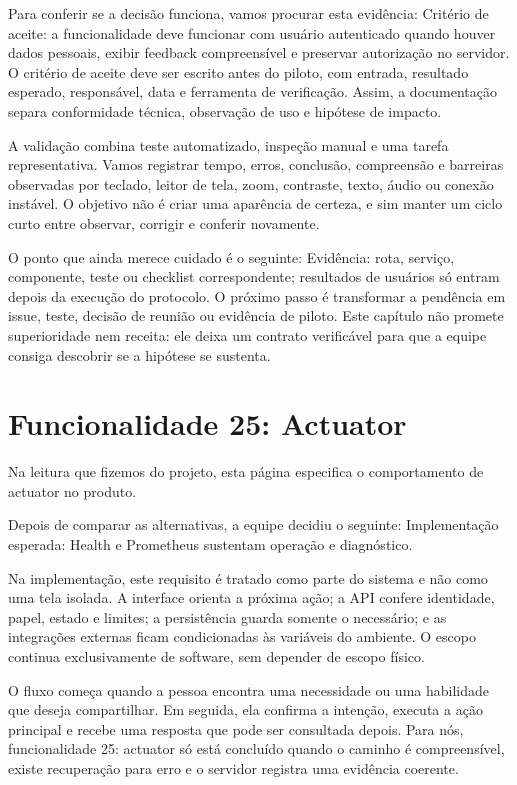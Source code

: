 \documentclass[12pt,oneside,a4paper,article]{abntex2}
\begin{document}
Para conferir se a decisão funciona, vamos procurar esta evidência: Critério de aceite: a funcionalidade deve funcionar com usuário autenticado quando houver dados pessoais, exibir feedback compreensível e preservar autorização no servidor. O critério de aceite deve ser escrito antes do piloto, com entrada, resultado esperado, responsável, data e ferramenta de verificação. Assim, a documentação separa conformidade técnica, observação de uso e hipótese de impacto.

A validação combina teste automatizado, inspeção manual e uma tarefa representativa. Vamos registrar tempo, erros, conclusão, compreensão e barreiras observadas por teclado, leitor de tela, zoom, contraste, texto, áudio ou conexão instável. O objetivo não é criar uma aparência de certeza, e sim manter um ciclo curto entre observar, corrigir e conferir novamente.

O ponto que ainda merece cuidado é o seguinte: Evidência: rota, serviço, componente, teste ou checklist correspondente; resultados de usuários só entram depois da execução do protocolo. O próximo passo é transformar a pendência em issue, teste, decisão de reunião ou evidência de piloto. Este capítulo não promete superioridade nem receita: ele deixa um contrato verificável para que a equipe consiga descobrir se a hipótese se sustenta.

\section{Funcionalidade 25: Actuator}
Na leitura que fizemos do projeto, esta página especifica o comportamento de actuator no produto.

Depois de comparar as alternativas, a equipe decidiu o seguinte: Implementação esperada: Health e Prometheus sustentam operação e diagnóstico.

Na implementação, este requisito é tratado como parte do sistema e não como uma tela isolada. A interface orienta a próxima ação; a API confere identidade, papel, estado e limites; a persistência guarda somente o necessário; e as integrações externas ficam condicionadas às variáveis do ambiente. O escopo continua exclusivamente de software, sem depender de escopo físico.

O fluxo começa quando a pessoa encontra uma necessidade ou uma habilidade que deseja compartilhar. Em seguida, ela confirma a intenção, executa a ação principal e recebe uma resposta que pode ser consultada depois. Para nós, funcionalidade 25: actuator só está concluído quando o caminho é compreensível, existe recuperação para erro e o servidor registra uma evidência coerente.
\end{document}
